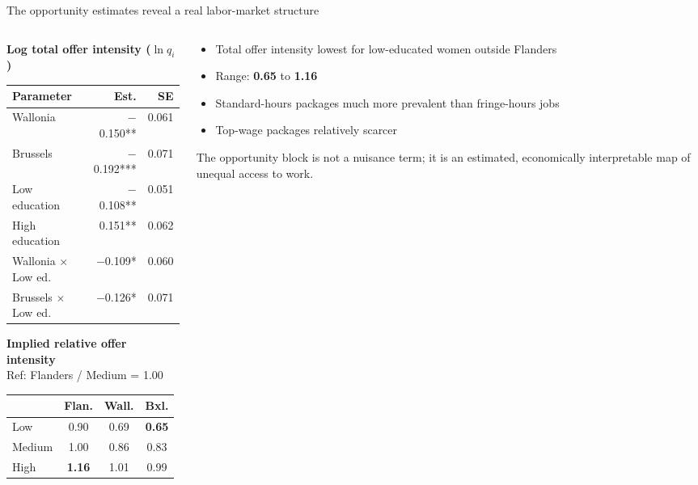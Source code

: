 \documentclass[aspectratio=169,11pt]{beamer}
\newcommand{\emphnum}[1]{\textcolor{cblue}{\textbf{#1}}}
\begin{document}
\begin{frame}{The opportunity estimates reveal a real labor-market structure}

\begin{columns}[T]
\begin{column}{0.52\textwidth}
\footnotesize
\textbf{Log total offer intensity ($\ln q_i$)}\\[4pt]
\begin{tabular}{@{}l r r@{}}
\toprule
\textbf{Parameter} & \textbf{Est.} & \textbf{SE} \\
\midrule
Wallonia                   & $-$0.150** & 0.061 \\
Brussels                   & $-$0.192*** & 0.071 \\
Low education              & $-$0.108** & 0.051 \\
High education             & 0.151** & 0.062 \\
Wallonia $\times$ Low ed.  & $-$0.109* & 0.060 \\
Brussels $\times$ Low ed.  & $-$0.126* & 0.071 \\
\bottomrule
\end{tabular}

\bigskip
\textbf{Implied relative offer intensity}\\
\scriptsize Ref: Flanders / Medium = 1.00\\[4pt]
\footnotesize
\begin{tabular}{@{}l ccc@{}}
\toprule
 & Flan. & Wall. & Bxl. \\
\midrule
Low    & 0.90 & 0.69 & \emphnum{0.65} \\
Medium & 1.00 & 0.86 & 0.83 \\
High   & \emphnum{1.16} & 1.01 & 0.99 \\
\bottomrule
\end{tabular}
\end{column}
\begin{column}{0.44\textwidth}
\begin{itemize}\footnotesize
\item Total offer intensity lowest for low-educated women outside Flanders
\item Range: \emphnum{0.65} to \emphnum{1.16}
\item Standard-hours packages much more prevalent than fringe-hours jobs
\item Top-wage packages relatively scarcer
\end{itemize}

\medskip
\scriptsize
\textcolor{cgrey}{The opportunity block is not a nuisance term; it is an estimated, economically interpretable map of unequal access to work.}
\end{column}
\end{columns}
\end{frame}
\end{document}
